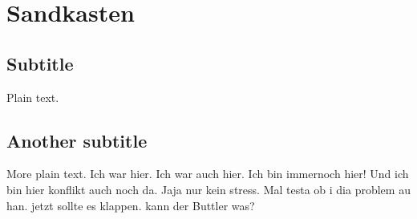 \documentclass{article}
\begin{document}
\section{Sandkasten}

\subsection{Subtitle}

Plain text.
\subsection{Another subtitle}

More plain text.
Ich war hier.
Ich war auch hier.
Ich bin immernoch hier!
Und ich bin hier konflikt auch noch da.
Jaja nur kein stress.
Mal testa ob i dia problem au han.
jetzt sollte es klappen.
kann der Buttler was?
\end{document}
